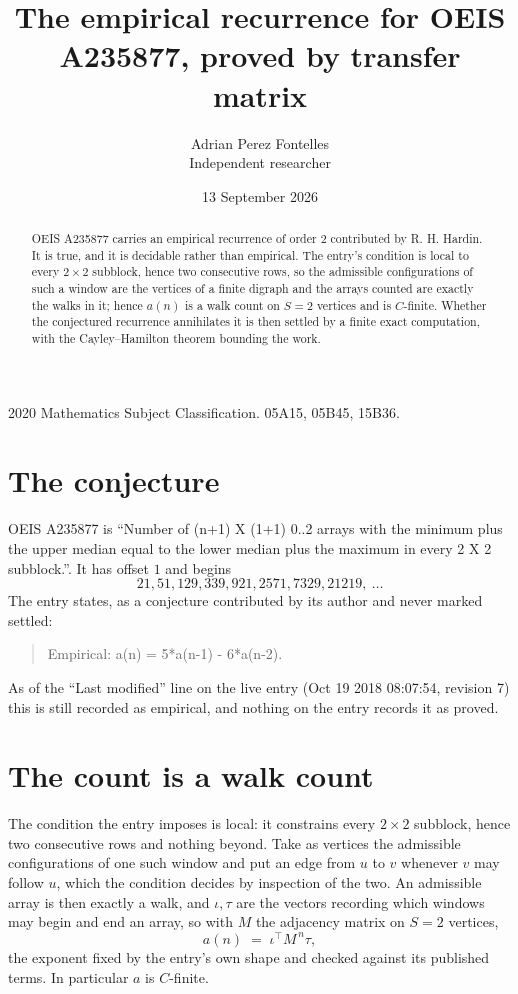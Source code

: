 \documentclass[11pt,a4paper]{article}
\title{The empirical recurrence for OEIS A235877, proved by transfer matrix}
\author{Adrian Perez Fontelles\\ \small Independent researcher}
\date{13 September 2026}
\theoremstyle{plain}
\theoremstyle{definition}
\begin{document}
\maketitle

\begin{abstract}
OEIS A235877 carries an empirical recurrence of order $2$ contributed by R. H. Hardin. It is
true, and it is decidable rather than empirical. The entry's condition is local to every $2\times2$ subblock, hence two consecutive rows, so
the admissible configurations of such a window are the vertices of a finite digraph and the
arrays counted are exactly the walks in it; hence $a(n)$ is a walk count on $S=2$ vertices
and is $C$-finite. Whether the conjectured recurrence annihilates it is then settled by a
finite exact computation, with the Cayley--Hamilton theorem bounding the work.
\end{abstract}

\noindent\small 2020 Mathematics Subject Classification. 05A15, 05B45, 15B36.\normalsize

\section{The conjecture}

OEIS A235877 is ``Number of (n+1) X (1+1) 0..2 arrays with the minimum plus the upper median equal to the lower median plus the maximum in every 2 X 2 subblock.''. It has offset $1$ and begins
\[
21, 51, 129, 339, 921, 2571, 7329, 21219,\ \dots
\]
The entry states, as a conjecture contributed by its author and never marked settled:
\begin{quote}
Empirical: a(n) = 5*a(n-1) - 6*a(n-2).
\end{quote}
As of the ``Last modified'' line on the live entry (Oct 19 2018 08:07:54, revision 7) this is still
recorded as empirical, and nothing on the entry records it as proved.

\section{The count is a walk count}

The condition the entry imposes is local: it constrains every $2\times2$ subblock, hence two consecutive rows and nothing beyond. Take as vertices the admissible configurations of one such window and put an edge from $u$ to $v$ whenever $v$ may follow $u$, which the condition decides by inspection of the two.
An admissible array is then exactly a walk, and $\iota,\tau$ are the vectors recording which windows may begin and end an array, so with $M$ the adjacency matrix on $S=2$ vertices,
\[
a(n)\;=\;\iota^{\!\top}M^{\,n}\tau ,
\]
the exponent fixed by the entry's own shape and checked against its published terms. In
particular $a$ is $C$-finite.
\end{document}
